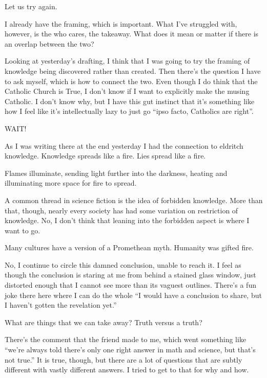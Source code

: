 \documentclass[12pt]{article}[titlepage]
\newcommand{\say}[1]{``#1''}
\renewcommand{\,}{\textsuperscript{,}}
\begin{document}
Let us try again.

I already have the framing, which is important.
What I've struggled with, however, is the who cares, the takeaway.
What does it mean or matter if there is an overlap between the two?

Looking at yesterday's drafting, I think that I was going to try the framing of knowledge being discovered rather than created.
Then there's the question I have to ask myself, which is how to connect the two.
Even though I do think that the Catholic Church is True, I don't know if I want to explicitly make the musing Catholic.
I don't know why, but I have this gut instinct that it's something like how I feel like it's intellectually lazy to just go \say{ipso facto, Catholics are right}.

WAIT!

As I was writing there at the end yesterday I had the connection to eldritch knowledge.
Knowledge spreads like a fire.
Lies spread like a fire.

Flames illuminate, sending light further into the darkness, heating and illuminating more space for fire to spread.\endnotemark[2]

A common thread in science fiction is the idea of forbidden knowledge.
More than that, though, nearly every society has had some variation on restriction of knowledge.
No, I don't think that leaning into the forbidden aspect is where I want to go.

Many cultures have a version of a Promethean myth.
Humanity was gifted fire.

No, I continue to circle this damned\endnotemark[3] conclusion, unable to reach it.
I feel as though the conclusion is staring at me from behind a stained glass window, just distorted enough that I cannot see more than its vaguest outlines.
There's a fun joke there here where I can do the whole \say{I would have a conclusion to share, but I haven't gotten the revelation yet.}

What are things that we can take away?
Truth versus a truth?

There's the comment that the friend made to me, which went something like \say{we're always told there's only one right answer in math and science, but that's not true.}
It is true, though, but there are a lot of questions that are subtly different with vastly different answers.
I tried to get to that for why and how.
\end{document}
